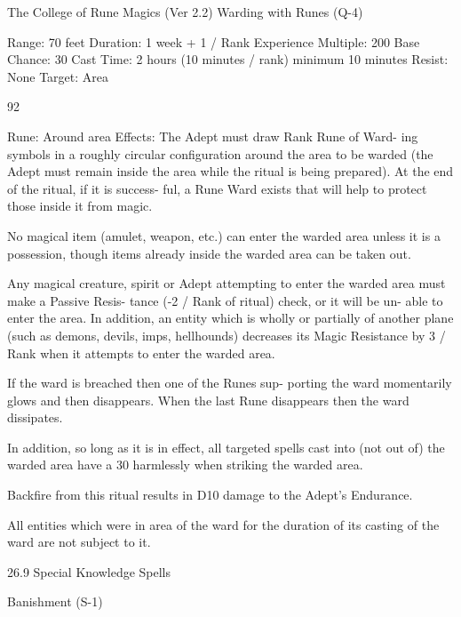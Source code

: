 \begin{Chapter}{The College of Rune Magics (Ver 2.2)}
Warding with Runes (Q-4) 

Range: 70 feet 
Duration: 1 week + 1 / Rank 
Experience Multiple: 200 
Base Chance: 30%
Cast  Time:  2  hours  (10  minutes  /  rank)  minimum 
10 minutes 
Resist: None 
Target: Area 

92 

Rune: Around area 
Effects: The Adept must draw Rank Rune of Ward-
ing  symbols  in  a  roughly  circular  configuration 
around  the  area  to  be  warded  (the  Adept  must 
remain  inside  the  area  while  the  ritual  is  being 
prepared). At the end of the ritual, if it is success-
ful,  a  Rune  Ward  exists  that  will  help  to  protect 
those inside it from magic. 

No  magical  item  (amulet,  weapon,  etc.)  can  enter 
the  warded  area  unless  it  is  a  possession,  though 
items  already  inside  the  warded  area  can  be  taken 
out. 

Any magical creature, spirit or Adept attempting to 
enter  the  warded  area  must  make  a  Passive  Resis-
tance  (-2  /  Rank  of  ritual)  check,  or  it  will  be  un-
able  to  enter  the  area.  In  addition,  an  entity  which 
is  wholly  or  partially  of  another  plane  (such  as 
demons,  devils,  imps,  hellhounds)  decreases  its 
Magic Resistance by  3  /  Rank  when it attempts  to 
enter the warded area. 

If the ward is breached then one of the Runes sup-
porting  the  ward  momentarily  glows  and  then 
disappears. When the last Rune disappears then the 
ward dissipates. 

In  addition,  so  long  as  it  is  in  effect,  all  targeted 
spells cast into (not out of) the warded area have a 
30%
harmlessly when striking the warded area. 

Backfire  from this  ritual  results in  D10  damage  to 
the Adept’s Endurance. 

All entities which were in area of the ward for the 
duration of its casting of the ward are not subject to 
it. 

26.9 Special Knowledge Spells 

Banishment (S-1) 


\end{Chapter}
